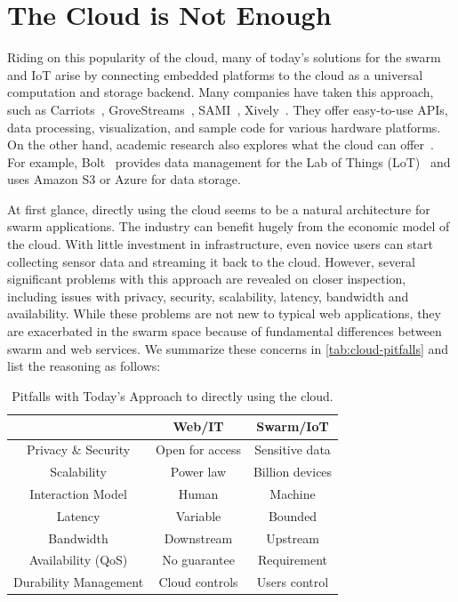 \section{The Cloud is Not Enough}
\label{sec:cloud-not-enough}

Riding on this popularity of the cloud, many of today's solutions for the swarm
and IoT arise by connecting embedded platforms to the cloud as a universal
computation and storage backend. Many companies have taken this approach, such
as Carriots~\cite{carriots}, GroveStreams~\cite{grovestreams}, SAMI~\cite{sami},
Xively~\cite{xively}. They offer easy-to-use APIs, data processing,
visualization, and sample code for various hardware platforms. On the other
hand, academic research also explores what the cloud can
offer~\cite{gupta2014bolt, zachariah1001internet}.  For example,
Bolt~\cite{gupta2014bolt} provides data management for the Lab of Things
(LoT)~\cite{brush2013lab} and uses Amazon S3 or Azure for data storage.

At first glance, directly using the cloud seems to be a natural architecture for
swarm applications. The industry can benefit hugely from the economic model of
the cloud. With little investment in infrastructure, even novice users can start
collecting sensor data and streaming it back to the cloud. However, several
significant problems with this approach are revealed on closer inspection,
including issues with privacy, security, scalability, latency, bandwidth and
availability.  While these problems are not new to typical web applications,
they are exacerbated in the swarm space because of fundamental differences
between swarm and web services. We summarize these concerns in
\autoref{tab:cloud-pitfalls} and list the reasoning as follows:

\begin{table}
  \centering
  \begin{tabular}{c c c}
    \toprule
    & Web/IT & Swarm/IoT \\
    \midrule
    Privacy \& Security & Open for access & Sensitive data \\
    Scalability & Power law & Billion devices \\
    Interaction Model & Human & Machine \\
    Latency & Variable & Bounded  \\
    Bandwidth & Downstream & Upstream   \\
    Availability (QoS) & No guarantee & Requirement  \\
    Durability Management & Cloud controls & Users control \\
    \bottomrule
  \end{tabular}
  \caption{Pitfalls with Today's Approach to directly using the cloud.}
  \label{tab:cloud-pitfalls}
\end{table}

